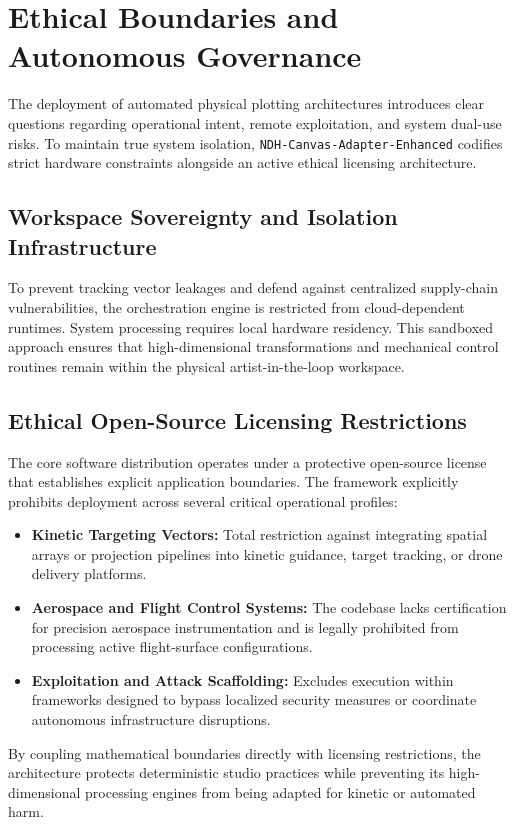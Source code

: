 
\section{Ethical Boundaries and Autonomous Governance}
\label{sec:ethics}

The deployment of automated physical plotting architectures introduces clear questions regarding operational intent, remote exploitation, and system dual-use risks. To maintain true system isolation, \texttt{NDH-Canvas-Adapter-Enhanced} codifies strict hardware constraints alongside an active ethical licensing architecture.

\subsection{Workspace Sovereignty and Isolation Infrastructure}

To prevent tracking vector leakages and defend against centralized supply-chain vulnerabilities, the orchestration engine is restricted from cloud-dependent runtimes. System processing requires local hardware residency. This sandboxed approach ensures that high-dimensional transformations and mechanical control routines remain within the physical artist-in-the-loop workspace.

\subsection{Ethical Open-Source Licensing Restrictions}

The core software distribution operates under a protective open-source license that establishes explicit application boundaries. The framework explicitly prohibits deployment across several critical operational profiles:

\begin{itemize}
    \item \textbf{Kinetic Targeting Vectors:} Total restriction against integrating spatial arrays or projection pipelines into kinetic guidance, target tracking, or drone delivery platforms.
    \item \textbf{Aerospace and Flight Control Systems:} The codebase lacks certification for precision aerospace instrumentation and is legally prohibited from processing active flight-surface configurations.
    \item \textbf{Exploitation and Attack Scaffolding:} Excludes execution within frameworks designed to bypass localized security measures or coordinate autonomous infrastructure disruptions.
\end{itemize}

By coupling mathematical boundaries directly with licensing restrictions, the architecture protects deterministic studio practices while preventing its high-dimensional processing engines from being adapted for kinetic or automated harm.
